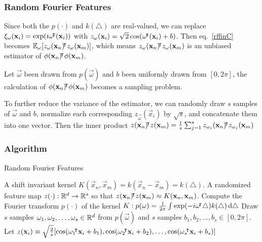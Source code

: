 \documentclass[10pt]{../formats/RU}
\begin{document}
\begin{frame}
  \frametitle{Random Fourier Features}
  Since both the $p(\cdot)$ and $k(\triangle)$ are real-valued, we can replace $\xi_{\mathbf{\omega}}(\mathbf{x}_i)=\exp(i\mathbf{\omega}{}^{\mkern-4mu\intercal}(\mathbf{x}_i))$ with
  $
  z_{\mathbf{\omega}}(\mathbf{x}_i)=\sqrt{2}\cos(\mathbf{\omega}{}^{\mkern-4mu\intercal}(\mathbf{x}_i)+b)$. Then eq.~\eqref{rffinC} becomes $\mathbb{E}_{\mathbf{\omega}}[z_{\mathbf{\omega}}(\mathbf{x}_n){}^{\mkern-4mu\intercal} z_{\mathbf{\omega}}(\mathbf{x}_m)]$, which means $z_{\mathbf{\omega}}(\mathbf{x}_n){}^{\mkern-4mu\intercal} z_{\mathbf{\omega}}(\mathbf{x}_m)$ is an unbiased estimator of $\phi(\mathbf{x}_n){}^{\mkern-4mu\intercal}\phi(\mathbf{x}_m)$.

  Let $\vec{\omega}$ been drawn from $p(\vec{\omega})$ and $b$ been uniformly drawn from $[0, 2\pi]$, the calculation of $\phi(\mathbf{x}_n){}^{\mkern-4mu\intercal}\phi(\mathbf{x}_m)$ becomes a sampling problem.

  To further reduce the variance of the estimator, we can randomly draw $s$ samples of $\vec{\omega}$ and $b$, normalize each corresponding $z_{\vec{\omega}}(\vec{x}_i)$ by $\sqrt{s}$, and concatenate them into one vector. Then the inner product $z(\mathbf{x}_n){}^{\mkern-4mu\intercal} z(\mathbf{x}_m)=\frac{1}{s}\sum_{j=1}^{s}z_{\mathbf{\omega}_j}(\mathbf{x}_n){}^{\mkern-4mu\intercal} z_{\mathbf{\omega}_j}(\mathbf{x}_m)$
\end{frame}
\begin{frame}
  \frametitle{Algorithm}
  \begin{algorithm}[H]
    \caption{Random Fourier Features}\label{RFF}
    \begin{algorithmic}
    \Require A shift invariant kernel $K(\vec{x}_n, \vec{x}_m) = k(\vec{x}_n- \vec{x}_m)=k(\triangle)$.
    \Ensure A randomized feature map $z(\cdot): \mathbb{R}^d\rightarrow\mathbb{R}^s$ so that $z(\mathbf{x}_n){}^{\mkern-4mu\intercal} z(\mathbf{x}_m)\approx K(\mathbf{x}_n, \mathbf{x}_m)$.
    \State Compute the Fourier transform $p(\cdot)$ of the kernel $K: p(\mathbf{\omega})=\frac{1}{2\pi}\int \exp(-i\mathbf{\omega}{}^{\mkern-4mu\intercal}\triangle)k(\triangle)\mathop{}\!\mathrm{d}\triangle$
    \State Draw $s$ \iid samples $\mathbf{\omega}_1, \mathbf{\omega}_2, \ldots, \mathbf{\omega}_s \in \mathbb{R}^d$ from $p(\vec{\omega})$ and $s$ \iid samples $b_1, b_2, \ldots, b_s \in [0, 2\pi]$.
    \State Let $z(\mathbf{x}_i)\equiv \sqrt{\frac{2}{s}}[\cos(\mathbf{\omega}_1{}^{\mkern-4mu\intercal}\mathbf{x}_i+b_1), \cos(\mathbf{\omega}_2{}^{\mkern-4mu\intercal}\mathbf{x}_i+b_2), \ldots, \cos(\mathbf{\omega}_s{}^{\mkern-4mu\intercal}\mathbf{x}_i+b_s)]$
    \end{algorithmic}
  \end{algorithm}
\end{frame}
\end{document}
